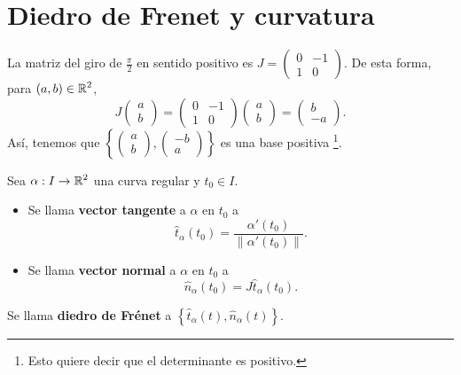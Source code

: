 \section{Diedro de Frenet y curvatura}
\begin{notation}
	La matriz del giro de $\displaystyle \frac{\pi }{2} $ en sentido positivo es $\displaystyle J = \begin{pmatrix} 0 & -1 \\ 1 & 0 \end{pmatrix} $. De esta forma, para $\displaystyle \left(a,b\right)\in \mathbb{R}^{2} $, 
	\[J\begin{pmatrix} a \\ b \end{pmatrix}=\begin{pmatrix} 0 & -1 \\ 1 & 0 \end{pmatrix}\begin{pmatrix} a \\b \end{pmatrix} = \begin{pmatrix} b \\ - a \end{pmatrix} .\]
	Así, tenemos que $\displaystyle \left\{ \begin{pmatrix} a \\ b \end{pmatrix}, \begin{pmatrix} -b \\ a \end{pmatrix}\right\}  $ es una base positiva \footnote{Esto quiere decir que el determinante es positivo.}.
\end{notation}

\begin{definition}
Sea $\displaystyle \alpha : I \to \mathbb{R}^{2} $ una curva regular y $\displaystyle t_{0} \in I $.
\begin{itemize}
\item Se llama \textbf{vector tangente} a $\displaystyle \alpha  $ en $\displaystyle t_{0} $ a
	\[\hat{t}_{\alpha }\left(t_{0}\right) = \frac{\alpha'\left(t_{0}\right)}{\|\alpha'\left(t_{0}\right)\|} .\]
\item Se llama \textbf{vector normal} a $\displaystyle \alpha  $ en $\displaystyle t_{0} $ a
	\[\hat{n}_{\alpha }\left(t_{0}\right)=J \hat{t}_{\alpha }\left(t_{0}\right) .\]
\end{itemize}
Se llama \textbf{diedro de Frénet} a $\displaystyle \left\{ \hat{t}_{\alpha }\left(t\right), \hat{n}_{\alpha }\left(t\right)\right\}  $. 
\end{definition}

